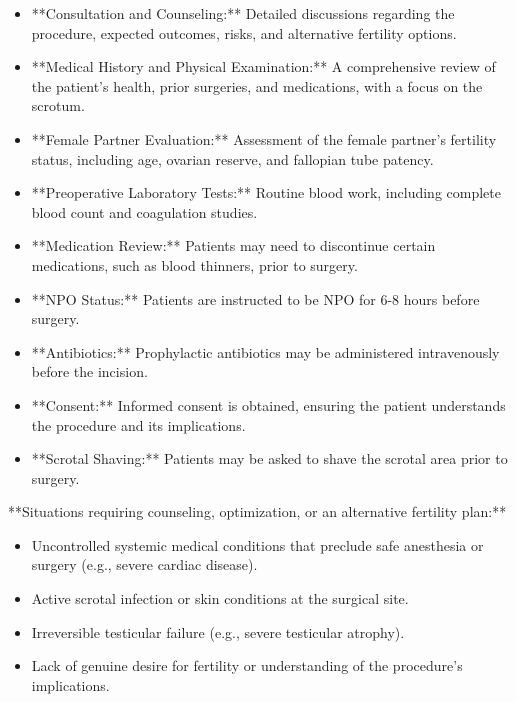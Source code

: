 \begin{itemize}
  \item **Consultation and Counseling:** Detailed discussions regarding the procedure, expected outcomes, risks, and alternative fertility options.
  
  \item **Medical History and Physical Examination:** A comprehensive review of the patient's health, prior surgeries, and medications, with a focus on the scrotum.
  
  \item **Female Partner Evaluation:** Assessment of the female partner's fertility status, including age, ovarian reserve, and fallopian tube patency.
  
  \item **Preoperative Laboratory Tests:** Routine blood work, including complete blood count and coagulation studies.
  
  \item **Medication Review:** Patients may need to discontinue certain medications, such as blood thinners, prior to surgery.
  
  \item **NPO Status:** Patients are instructed to be NPO for 6-8 hours before surgery.
  
  \item **Antibiotics:** Prophylactic antibiotics may be administered intravenously before the incision.
  
  \item **Consent:** Informed consent is obtained, ensuring the patient understands the procedure and its implications.
  
  \item **Scrotal Shaving:** Patients may be asked to shave the scrotal area prior to surgery.
\end{itemize}

**Situations requiring counseling, optimization, or an alternative fertility plan:**
\begin{itemize}
  \item Uncontrolled systemic medical conditions that preclude safe anesthesia or surgery (e.g., severe cardiac disease).
  \item Active scrotal infection or skin conditions at the surgical site.
  \item Irreversible testicular failure (e.g., severe testicular atrophy).
  \item Lack of genuine desire for fertility or understanding of the procedure's implications.
\end{itemize}

